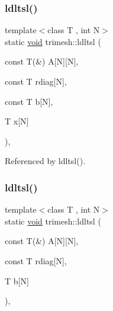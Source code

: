 \mbox{\label{namespacetrimesh_abee7a794a3869cf0726a95c56db2871a}} 
\subsubsection{\texorpdfstring{ldltsl()}{ldltsl()}\hspace{0.1cm}{\footnotesize\ttfamily [1/2]}}
{\footnotesize\ttfamily template$<$class T , int N$>$ \\
static \hyperlink{namespacetrimesh_a784ddfd979e1c579bda795a8edfc3f43}{void} trimesh\+::ldltsl (\begin{DoxyParamCaption}\item[{const T(\&)}]{A\mbox{[}\+N\mbox{]}\mbox{[}\+N\mbox{]},  }\item[{const T}]{rdiag\mbox{[}\+N\mbox{]},  }\item[{const T}]{b\mbox{[}\+N\mbox{]},  }\item[{T}]{x\mbox{[}\+N\mbox{]} }\end{DoxyParamCaption})\hspace{0.3cm}{\ttfamily [inline]}, {\ttfamily [static]}}



Referenced by ldltsl().

\mbox{\label{namespacetrimesh_ae5fc68fc5367dff5d2591b960ccc222f}} 
\subsubsection{\texorpdfstring{ldltsl()}{ldltsl()}\hspace{0.1cm}{\footnotesize\ttfamily [2/2]}}
{\footnotesize\ttfamily template$<$class T , int N$>$ \\
static \hyperlink{namespacetrimesh_a784ddfd979e1c579bda795a8edfc3f43}{void} trimesh\+::ldltsl (\begin{DoxyParamCaption}\item[{const T(\&)}]{A\mbox{[}\+N\mbox{]}\mbox{[}\+N\mbox{]},  }\item[{const T}]{rdiag\mbox{[}\+N\mbox{]},  }\item[{T}]{b\mbox{[}\+N\mbox{]} }\end{DoxyParamCaption})\hspace{0.3cm}{\ttfamily [inline]}, {\ttfamily [static]}}

